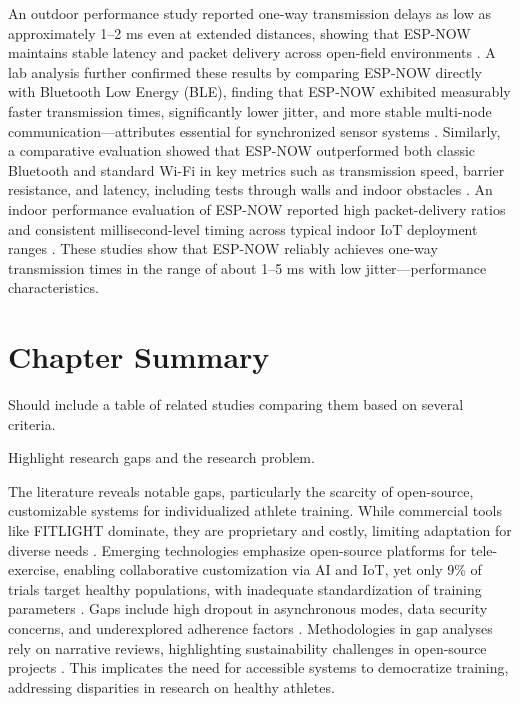 	An outdoor performance study reported one-way transmission delays as low as approximately 1–2 ms even at extended distances, showing that ESP-NOW maintains stable latency and packet delivery across open-field environments \parencite{Becker:2025:POE}. A lab analysis further confirmed these results by comparing ESP-NOW directly with Bluetooth Low Energy (BLE), finding that ESP-NOW exhibited measurably faster transmission times, significantly lower jitter, and more stable multi-node communication—attributes essential for synchronized sensor systems \parencite{Labib:2021:ENS}. Similarly, a comparative evaluation showed that ESP-NOW outperformed both classic Bluetooth and standard Wi-Fi in key metrics such as transmission speed, barrier resistance, and latency, including tests through walls and indoor obstacles \parencite{Eridani:2021:CPS}. An indoor performance evaluation of ESP-NOW reported high packet-delivery ratios and consistent millisecond-level timing across typical indoor IoT deployment ranges \parencite{Urazayev:2023:IPE}. These studies show that ESP-NOW reliably achieves one-way transmission times in the range of about 1–5 ms with low jitter—performance characteristics.


\section{Chapter Summary}
Should include a table of related studies comparing them based on several criteria.

Highlight research gaps and the research problem.

	The literature reveals notable gaps, particularly the scarcity of open-source, customizable systems for individualized athlete training. While commercial tools like FITLIGHT dominate, they are proprietary and costly, limiting adaptation for diverse needs \parencite{Seckin:2023:RWT}. Emerging technologies emphasize open-source platforms for tele-exercise, enabling collaborative customization via AI and IoT, yet only 9\% of trials target healthy populations, with inadequate standardization of training parameters \parencite{Rebelo:2023:FDA}. Gaps include high dropout in asynchronous modes, data security concerns, and underexplored adherence factors \parencite{Rebelo:2023:FDA}. Methodologies in gap analyses rely on narrative reviews, highlighting sustainability challenges in open-source projects \parencite{Seckin:2023:RWT}. This implicates the need for accessible systems to democratize training, addressing disparities in research on healthy athletes.
	
